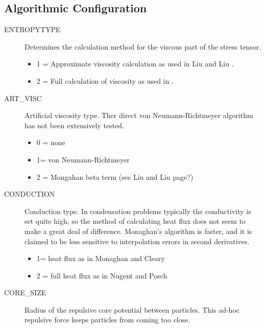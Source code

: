
\subsection{Algorithmic Configuration}
\begin{description}

\item[ENTROPYTYPE] Determines the calculation method for the viscous part
of the stress tensor. 
    \begin{itemize}
    \item 1 = Approximate viscosity calculation as used in Liu and Liu
    \cite[]{liu_smoothed_2003}.
    \item 2 = Full calculation of viscosity as used in
    \cite[]{sigalotti_sph_2003}.
    \end{itemize}

\item[ART\_VISC] Artificial viscosity type. Ther direct von Neumann-Richtmeyer
    algorithm has not been extensively tested.
    \begin{itemize}
    \item 0 = none 
    \item 1= von Neumann-Richtmeyer \cite[]{hoover_smooth_2006}
    \item 2 = Mongahan beta term (see Liu and Liu page?\cite{liu_smoothed_2003})
    \end{itemize}

\item[CONDUCTION] Conduction type. In condensation problems typically the
    conductivity is set quite high, so the method of calculating heat flux does not
    seem to make a great deal of difference. Monaghan's algorithm is faster, and it
    is claimed to be less sensitive to interpolation errors in second 
    derivatives.
    \begin{itemize}
    \item  1= heat flux as in Monaghan and Cleary \cite{cleary_conduction_2006}
    \item  2 = full heat flux as in Nugent and Posch \cite[]{nugent_liquid_2000}
    \end{itemize}
  
\item[CORE\_SIZE] Radius of the repulsive core potential between particles.
    This ad-hoc repulsive force keeps particles from coming too close.
    \cite[]{hoover_smooth_2006}


\end{description}
